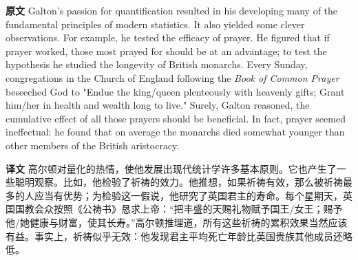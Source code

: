 \documentclass[UTF8,zihao=-4]{ctexart}
\newcommand{\BodyFont}{\fontsize{10.5pt}{15.5pt}\selectfont}
\renewenvironment{quote}{\par\noindent\begingroup\BodyFont}{\par\endgroup}
\begin{document}
\begin{quote}
\noindent\textbf{原文} Galton's passion for quantification resulted in his developing many of the fundamental principles of modern statistics. It also yielded some clever observations. For example, he tested the efficacy of prayer. He figured that if prayer worked, those most prayed for should be at an advantage; to test the hypothesis he studied the longevity of British monarchs. Every Sunday, congregations in the Church of England following the \emph{Book of Common Prayer} beseeched God to "Endue the king/queen plenteously with heavenly gifts; Grant him/her in health and wealth long to live." Surely, Galton reasoned, the cumulative effect of all those prayers should be beneficial. In fact, prayer seemed ineffectual: he found that on average the monarchs died somewhat younger than other members of the British aristocracy.

\smallskip
\noindent\textbf{译文} 高尔顿对量化的热情，使他发展出现代统计学许多基本原则。它也产生了一些聪明观察。比如，他检验了祈祷的效力。他推想，如果祈祷有效，那么被祈祷最多的人应当有优势；为检验这一假说，他研究了英国君主的寿命。每个星期天，英国国教会众按照《公祷书》恳求上帝：“把丰盛的天赐礼物赋予国王/女王；赐予他/她健康与财富，使其长寿。”高尔顿推理道，所有这些祈祷的累积效果当然应该有益。事实上，祈祷似乎无效：他发现君主平均死亡年龄比英国贵族其他成员还略低。
\end{quote}
\end{document}
